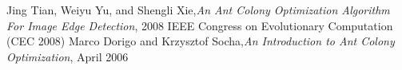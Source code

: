 \documentclass[11pt]{article}
\begin{document}
\begin{thebibliography}{99}



 Jing Tian, Weiyu Yu, and Shengli Xie,{\textit{An Ant Colony Optimization Algorithm For Image Edge Detection}}, 2008 IEEE Congress on Evolutionary Computation (CEC 2008) 
 Marco Dorigo and Krzysztof Socha,{\textit{An Introduction to
Ant Colony Optimization}}, April 2006

\end{thebibliography}
\end{document}
